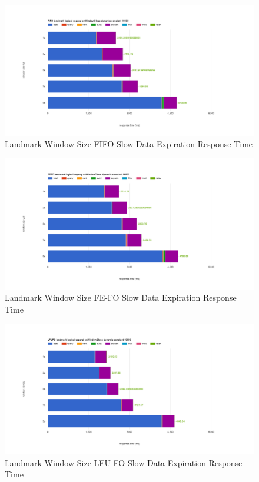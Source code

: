 \begin{figure}[!htbp]
    \centering
    \includegraphics[width=\textwidth]{img/app3-land-ws-fifo-slow-r.png}
    \caption{Landmark Window Size FIFO Slow Data Expiration Response Time}
\end{figure}
\begin{figure}[!htbp]
    \centering
    \includegraphics[width=\textwidth]{img/app3-land-ws-fefo-slow-r.png}
    \caption{Landmark Window Size FE-FO Slow Data Expiration Response Time}
\end{figure}
\begin{figure}[!htbp]
    \centering
    \includegraphics[width=\textwidth]{img/app3-land-ws-lfufo-slow-r.png}
    \caption{Landmark Window Size LFU-FO Slow Data Expiration Response Time}
\end{figure}
